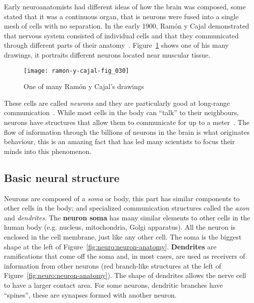 Early neuroanatomists had different ideas of how the brain was composed, some stated that it was a continuous organ, that is neurons were fused into a single mesh of cells with no separation. In the early 1900, Ramón y Cajal demonstrated that nervous system consisted of individual cells and that they communicated through different parts of their anatomy~\cite{Nemri:2010}. Figure~\ref{fig:neuro:ramon-y-cajal-neuro} shows one of his many drawings, it portraits different neurons located near muscular tissue.

\begin{figure}[hbt]
  \begin{center}
    \texttt{[image: ramon-y-cajal-fig\_030]}
    \caption{One of many Ramón y Cajal's drawings~\cite{cervantes-images}}
    \label{fig:neuro:ramon-y-cajal-neuro}
  \end{center}
\end{figure}

These cells are called \emph{neurons} and they are particularly good at  long-range communication~\cite{thompson2000brain}. While most cells in the body can ``talk'' to their neighbours, neurons have structures that allow them to communicate for up to a meter~\cite{eye-brain-vision-hubel1995}. The flow of information through the billions of neurons in the brain is what originates behaviour, this is an amazing fact that has led many scientists to focus their minds into this phenomenon.

\subsection{Basic neural structure}

Neurons are composed of a \emph{soma} or body, this part has similar components to other cells in the body; and specialized communication structures called the \emph{axon} and \emph{dendrites}. The \textbf{neuron soma} has many similar elements to other cells in the human body (e.g. nucleus, mitochondria, Golgi apparatus). All the neuron is enclosed in the cell membrane, just like any other cell. The soma is the biggest shape at the left of Figure~\ref{fig:neuro:neuron-anatomy}. \textbf{Dendrites} are ramifications that come off the soma and, in most cases, are used as receivers of information from other neurons (red branch-like structures at the left of Figure~\ref{fig:neuro:neuron-anatomy}). The shape of dendrites allows the nerve cell to have a larger contact area. For some neurons, dendritic branches have ``spines'', these are synapses formed with another neuron.

